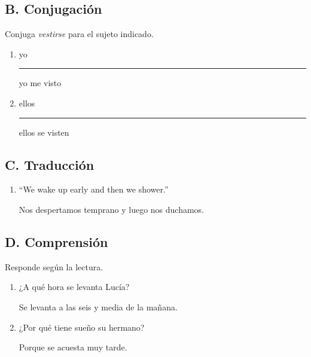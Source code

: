 \documentclass[11pt]{article}
\begin{document}
\subsection{B. Conjugación}
Conjuga \textit{vestirse} para el sujeto indicado.
\begin{enumerate}[leftmargin=*, label=\numbox{\arabic*}, resume]
    \item
        \begin{exercise}[1.2cm]
            yo \rule{4cm}{0.4pt}
        \end{exercise}
        \begin{solution}
            yo me visto
        \end{solution}
    \item
        \begin{exercise}[1.2cm]
            ellos \rule{4cm}{0.4pt}
        \end{exercise}
        \begin{solution}
            ellos se visten
        \end{solution}
\end{enumerate}

\subsection{C. Traducción}
\begin{enumerate}[leftmargin=*, label=\numbox{\arabic*}, resume]
    \item
        \begin{exercise}[2.5cm]
            ``We wake up early and then we shower.''
        \end{exercise}
        \begin{solution}
            Nos despertamos temprano y luego nos duchamos.
        \end{solution}
\end{enumerate}

\subsection{D. Comprensión}
Responde según la lectura.
\begin{enumerate}[leftmargin=*, label=\numbox{\arabic*}, resume]
    \item
        \begin{exercise}[2cm]
            ¿A qué hora se levanta Lucía?
        \end{exercise}
        \begin{solution}
            Se levanta a las seis y media de la mañana.
        \end{solution}
    \item
        \begin{exercise}[2.5cm]
            ¿Por qué tiene sueño su hermano?
        \end{exercise}
        \begin{solution}
            Porque se acuesta muy tarde.
        \end{solution}
\end{enumerate}
\end{document}
